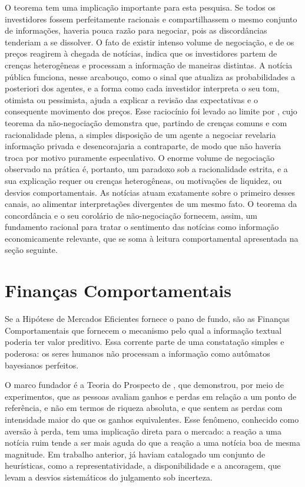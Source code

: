 O teorema tem uma implicação importante para esta pesquisa. Se todos os investidores fossem perfeitamente racionais e compartilhassem o mesmo conjunto de informações, haveria pouca razão para negociar, pois as discordâncias tenderiam a se dissolver. O fato de existir intenso volume de negociação, e de os preços reagirem à chegada de notícias, indica que os investidores partem de crenças heterogêneas e processam a informação de maneiras distintas. A notícia pública funciona, nesse arcabouço, como o sinal que atualiza as probabilidades a posteriori dos agentes, e a forma como cada investidor interpreta o seu tom, otimista ou pessimista, ajuda a explicar a revisão das expectativas e o consequente movimento dos preços. Esse raciocínio foi levado ao limite por , cujo teorema da não-negociação demonstra que, partindo de crenças comuns e com racionalidade plena, a simples disposição de um agente a negociar revelaria informação privada e desencorajaria a contraparte, de modo que não haveria troca por motivo puramente especulativo. O enorme volume de negociação observado na prática é, portanto, um paradoxo sob a racionalidade estrita, e a sua explicação requer ou crenças heterogêneas, ou motivações de liquidez, ou desvios comportamentais. As notícias atuam exatamente sobre o primeiro desses canais, ao alimentar interpretações divergentes de um mesmo fato. O teorema da concordância e o seu corolário de não-negociação fornecem, assim, um fundamento racional para tratar o sentimento das notícias como informação economicamente relevante, que se soma à leitura comportamental apresentada na seção seguinte.

\section{Finanças Comportamentais}

Se a Hipótese de Mercados Eficientes fornece o pano de fundo, são as Finanças Comportamentais que fornecem o mecanismo pelo qual a informação textual poderia ter valor preditivo. Essa corrente parte de uma constatação simples e poderosa: os seres humanos não processam a informação como autômatos bayesianos perfeitos.

O marco fundador é a Teoria do Prospecto de , que demonstrou, por meio de experimentos, que as pessoas avaliam ganhos e perdas em relação a um ponto de referência, e não em termos de riqueza absoluta, e que sentem as perdas com intensidade maior do que os ganhos equivalentes. Esse fenômeno, conhecido como aversão à perda, tem uma implicação direta para o mercado: a reação a uma notícia ruim tende a ser mais aguda do que a reação a uma notícia boa de mesma magnitude. Em trabalho anterior,  já haviam catalogado um conjunto de heurísticas, como a representatividade, a disponibilidade e a ancoragem, que levam a desvios sistemáticos do julgamento sob incerteza.

